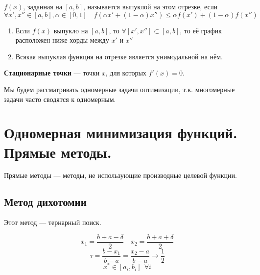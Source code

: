 \documentclass[12pt, a4paper, oneside]{book}
\begin{document}
\begin{definition}
    \(f(x)\), заданная на \([a, b]\), называется выпуклой на этом отрезке, если
    \[\forall x', x''\in [a, b], \alpha\in[0,1] \quad f(\alpha x' + (1 - \alpha)x'') \leq \alpha f(x') + (1 - \alpha)f(x'')\]
\end{definition}

\begin{prop}\itemfix
    \begin{enumerate}
        \item Если \(f(x)\) выпукло на \([a, b]\), то \(\forall [x', x''] \subset [a, b]\), то её график расположен ниже хорды между \(x'\) и \(x''\)
        \item Всякая выпуклая функция на отрезке является унимодальной на нём.
    \end{enumerate}
\end{prop}

\begin{definition}
    \textbf{Стационарные точки} --- точки \(x\), для которых \(f'(x) = 0\).
\end{definition}

Мы будем рассматривать одномерные задачи оптимизации, т.к. многомерные задачи часто сводятся к одномерным.

\section{Одномерная минимизация функций. Прямые методы.}

Прямые методы --- методы, не использующие производные целевой функции.

\subsection{Метод дихотомии}

Этот метод --- тернарный поиск.

\[x_1 = \frac{b + a - \delta}{2} \quad x_2 = \frac{b + a + \delta}{2}\]
\[\tau = \frac{b - x_1}{b - a} = \frac{x_2 - a}{b - a} \to \frac{1}{2}\]
\[x^* \in [a_i, b_i] \ \ \forall i\]
\end{document}
